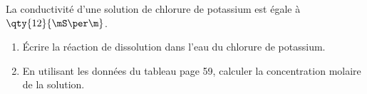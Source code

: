 La conductivité d'une solution de chlorure de potassium  est égale à
$\qty{12}{\mS\per\m}$.
\begin{enumerate}
    \item Écrire la réaction de dissolution dans l'eau du chlorure de potassium.
    \item En utilisant les données du tableau page 59, calculer la concentration
          molaire de la solution.
\end{enumerate}

